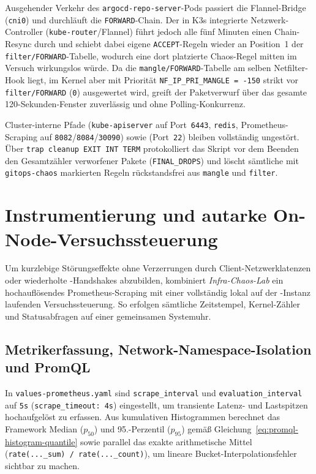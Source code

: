 Ausgehender Verkehr des \texttt{argocd-repo-server}-Pods passiert die Flannel-Bridge (\texttt{cni0}) und durchläuft die \texttt{FORWARD}-Chain. Der in K3s integrierte Netzwerk-Controller (\texttt{kube-router}/Flannel) führt jedoch alle fünf Minuten einen Chain-Resync durch und schiebt dabei eigene \texttt{ACCEPT}-Regeln wieder an Position~1 der \texttt{filter/FORWARD}-Tabelle, wodurch eine dort platzierte Chaos-Regel mitten im Versuch wirkungslos würde. Da die \texttt{mangle/FORWARD}-Tabelle am selben Netfilter-Hook liegt, im Kernel aber mit Priorität \texttt{NF\_IP\_PRI\_MANGLE = -150} strikt vor \texttt{filter/FORWARD} (\texttt{0}) ausgewertet wird, greift der Paketverwurf über das gesamte 120-Sekunden-Fenster zuverlässig und ohne Polling-Konkurrenz.

Cluster-interne Pfade (\texttt{kube-apiserver} auf Port~\texttt{6443}, \texttt{redis}, Prometheus-Scraping auf \texttt{8082}/\texttt{8084}/\texttt{30090}) sowie  (Port~\texttt{22}) bleiben vollständig ungestört. Über \texttt{trap cleanup EXIT INT TERM} protokolliert das Skript vor dem Beenden den Gesamtzähler verworfener Pakete (\texttt{FINAL\_DROPS}) und löscht sämtliche mit \texttt{\textquotedbl{}gitops-chaos\textquotedbl{}} markierten Regeln rückstandsfrei aus \texttt{mangle} und \texttt{filter}.

\section{Instrumentierung und autarke On-Node-Versuchssteuerung}
\label{sec:instrumentierung-versuchssteuerung-validierung}

Um kurzlebige Störungseffekte ohne Verzerrungen durch Client-Netzwerklatenzen oder wiederholte -Handshakes abzubilden, kombiniert \textit{Infra-Chaos-Lab} ein hochauflösendes Prometheus-Scraping mit einer vollständig lokal auf der -Instanz laufenden Versuchssteuerung. So erfolgen sämtliche Zeitstempel, Kernel-Zähler und Statusabfragen auf einer gemeinsamen Systemuhr.

\subsection{Metrikerfassung, Network-Namespace-Isolation und PromQL}
\label{subsec:metrikerfassung-promql}

In \texttt{values-prometheus.yaml} sind \texttt{scrape\_interval} und \texttt{evaluation\_interval} auf \texttt{5s} (\texttt{scrape\_timeout: 4s}) eingestellt, um transiente Latenz- und Lastspitzen hochaufgelöst zu erfassen. Aus kumulativen Histogrammen berechnet das Framework Median ($p_{50}$) und 95.-Perzentil ($p_{95}$) gemäß Gleichung~\ref{eq:promql-histogram-quantile} sowie parallel das exakte arithmetische Mittel (\texttt{rate(...\_sum) / rate(...\_count)}), um lineare Bucket-Interpolationsfehler sichtbar zu machen.\autocites[Kap.~16]{brazil_prometheus_2018}{prometheus_histograms_2026}

